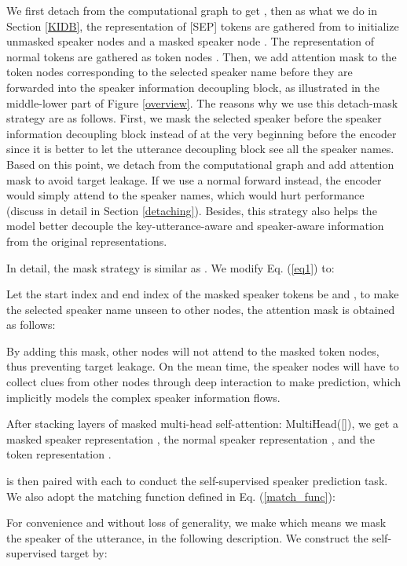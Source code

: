 \documentclass[11pt]{article}
\begin{document}
	We first detach  from the computational graph to get , then as what we do in Section \ref{KIDB}, the representation of [SEP] tokens are gathered from  to initialize  unmasked speaker nodes  and a masked speaker node . The representation of normal tokens are gathered as token nodes . Then, we add attention mask to the token nodes corresponding to the selected speaker name before they are forwarded into the speaker information decoupling block, as illustrated in the middle-lower part of Figure \ref{overview}. The reasons why we use this detach-mask strategy are as follows. First, we mask the selected speaker before the speaker information decoupling block instead of at the very beginning before the encoder since it is better to let the utterance decoupling block see all the speaker names. Based on this point, we detach  from the computational graph and add attention mask to avoid target leakage. If we use a normal forward instead, the encoder would simply attend to the speaker names, which would hurt performance (discuss in detail in Section \ref{detaching}). Besides, this strategy also helps the model better decouple the key-utterance-aware and speaker-aware information from the original representations.
	
	In detail, the mask strategy is similar as \citet{liu2021filling}. We modify Eq. (\ref{eq1}) to:
	
	Let the start index and end index of the masked speaker tokens be  and , to make the selected speaker name unseen to other nodes, the attention mask is obtained as follows:
	
	By adding this mask, other nodes will not attend to the masked token nodes, thus preventing target leakage. On the mean time, the speaker nodes will have to collect clues from other nodes through deep interaction to make prediction, which implicitly models the complex speaker information flows.
	
	After stacking  layers of masked multi-head self-attention:  MultiHead([]), we get a masked speaker representation , the normal speaker representation , and the token representation .
	
	 is then paired with each  to conduct the self-supervised speaker prediction task. We also adopt the matching function defined in Eq. (\ref{match_func}):
	
	For convenience and without loss of generality, we make  which means we mask the speaker of the  utterance, in the following description. We construct the self-supervised target by:
	
\end{document}
